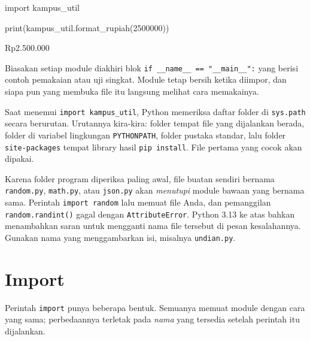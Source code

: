 \begin{kode}[main.py]
import kampus_util

print(kampus_util.format_rupiah(2500000))
\end{kode}

\begin{keluaran}
Rp2.500.000
\end{keluaran}

\begin{tips}
Biasakan setiap module diakhiri blok \texttt{if \_\_name\_\_ == "\_\_main\_\_":} yang berisi contoh pemakaian atau uji singkat. Module tetap bersih ketika diimpor, dan siapa pun yang membuka file itu langsung melihat cara memakainya.
\end{tips}

\begin{info}
Saat menemui \texttt{import kampus\_util}, Python memeriksa daftar folder di \texttt{sys.path} secara berurutan. Urutannya kira-kira: folder tempat file yang dijalankan berada, folder di variabel lingkungan \texttt{PYTHONPATH}, folder pustaka standar, lalu folder \texttt{site-packages} tempat library hasil \texttt{pip install}. File pertama yang cocok akan dipakai.
\end{info}

\begin{penting}
Karena folder program diperiksa paling awal, file buatan sendiri bernama \texttt{random.py}, \texttt{math.py}, atau \texttt{json.py} akan \emph{menutupi} module bawaan yang bernama sama. Perintah \texttt{import random} lalu memuat file Anda, dan pemanggilan \texttt{random.randint()} gagal dengan \texttt{AttributeError}. Python 3.13 ke atas bahkan menambahkan saran untuk mengganti nama file tersebut di pesan kesalahannya. Gunakan nama yang menggambarkan isi, misalnya \texttt{undian.py}.
\end{penting}

\section{Import}

Perintah \texttt{import} punya beberapa bentuk. Semuanya memuat module dengan cara yang sama; perbedaannya terletak pada \emph{nama} yang tersedia setelah perintah itu dijalankan.

